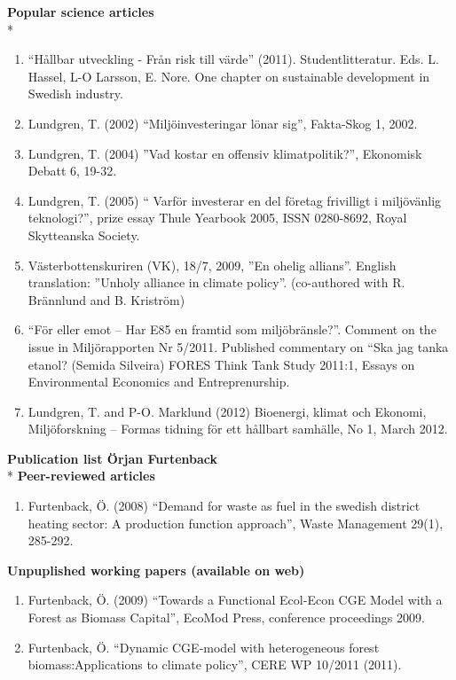 \documentclass[11pt,a4paper]{extarticle}
\begin{document}
\textbf{Popular science articles}\\*
\begin{enumerate}
	\item “Hållbar utveckling - Från risk till värde” (2011). Studentlitteratur. Eds. L. Hassel, L-O Larsson, E. Nore. One chapter on sustainable development in Swedish industry.
	\item Lundgren, T. (2002) “Miljöinvesteringar lönar sig”, Fakta-Skog 1, 2002.
	\item Lundgren, T. (2004) ”Vad kostar en offensiv klimatpolitik?”, Ekonomisk Debatt 6, 19-32.
	\item Lundgren, T. (2005) “ Varför investerar en del företag frivilligt i miljövänlig teknologi?”, prize essay Thule Yearbook 2005, ISSN 0280-8692, Royal Skytteanska Society.
	\item Västerbottenskuriren (VK), 18/7, 2009, ”En ohelig allians”. English translation: ”Unholy alliance in climate policy”. (co-authored with R. Brännlund and B. Kriström)
	\item “För eller emot – Har E85 en framtid som miljöbränsle?”. Comment on the issue in Miljörapporten Nr 5/2011. Published commentary on “Ska jag tanka etanol? (Semida Silveira) FORES Think Tank Study 2011:1, Essays on Environmental Economics and Entreprenurship.
	\item Lundgren, T. and P-O. Marklund (2012) Bioenergi, klimat och Ekonomi, Miljöforskning – Formas tidning för ett hållbart samhälle, No 1, March 2012.
\end{enumerate}


\textbf{Publication list Örjan Furtenback}\\*
\textbf{Peer-reviewed articles}
\begin{enumerate}
	\item Furtenback, Ö. (2008) “Demand for waste as fuel in the swedish district heating sector: A production function approach”, Waste Management 29(1), 285-292.
\end{enumerate}

\textbf{Unpuplished working papers (available on web)}
\begin{enumerate}
	\item Furtenback, Ö. (2009) “Towards a Functional Ecol-Econ CGE Model with a Forest as Biomass Capital”, EcoMod Press, conference proceedings 2009.
	\item Furtenback, Ö.  “Dynamic CGE-model with heterogeneous forest biomass:Applications to climate policy”, CERE WP 10/2011 (2011).
\end{enumerate}
\end{document}
